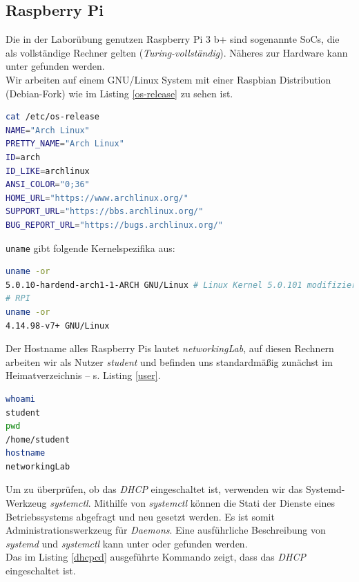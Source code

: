\documentclass[paper=a4,fontsize=11pt]{scrartcl}%
\numberwithin{equation}{section}
\begin{document}
\subsection{Raspberry Pi} \label{rpi}
Die in der Laborübung genutzen Raspberry Pi 3 b+ sind sogenannte \acp{SoC}, die als vollständige Rechner gelten (\textit{Turing-vollständig}). Näheres zur Hardware kann unter \cite{rpi} gefunden werden.\\
Wir arbeiten auf einem \acs{GNU}/Linux System mit einer Raspbian Distribution (Debian-Fork) wie im Listing \ref{os-release} zu sehen ist.
\begin{lstlisting}[style=Bash, language=Bash, label=os-release]
cat /etc/os-release
NAME="Arch Linux"
PRETTY_NAME="Arch Linux"
ID=arch
ID_LIKE=archlinux
ANSI_COLOR="0;36"
HOME_URL="https://www.archlinux.org/"
SUPPORT_URL="https://bbs.archlinux.org/"
BUG_REPORT_URL="https://bugs.archlinux.org/"
\end{lstlisting}
\texttt{uname} gibt folgende Kernelspezifika aus:
\begin{lstlisting}[style=Bash, language=Bash]
uname -or
5.0.10-hardend-arch1-1-ARCH GNU/Linux # Linux Kernel 5.0.101 modifizierter, gehaerteten Kern
# RPI
uname -or
4.14.98-v7+ GNU/Linux
\end{lstlisting} 
Der Hostname alles Raspberry Pis lautet \emph{networkingLab}, auf diesen Rechnern arbeiten wir als Nutzer \emph{student} und befinden uns standardmäßig zunächst im Heimatverzeichnis -- s. Listing \ref{user}.
\begin{lstlisting}[style=Bash, language=Bash, label=user]
whoami
student
pwd
/home/student
hostname
networkingLab
\end{lstlisting}
Um zu überprüfen, ob das \emph{\ac{DHCP}} eingeschaltet ist, verwenden wir das Systemd-Werkzeug \textit{systemctl}. Mithilfe von \textit{systemctl} können die Stati der Dienste eines Betriebssystems abgefragt und neu gesetzt werden. Es ist somit Administrationswerkzeug für \emph{Daemons}. Eine ausführliche Beschreibung von \emph{systemd} und \textit{systemctl} kann unter \cite{arch_systemd} oder \cite{debian_systemd} gefunden werden.\\
Das im Listing \ref{dhcpcd} ausgeführte Kommando zeigt, dass das \emph{\ac{DHCP}} eingeschaltet ist.
\end{document}
